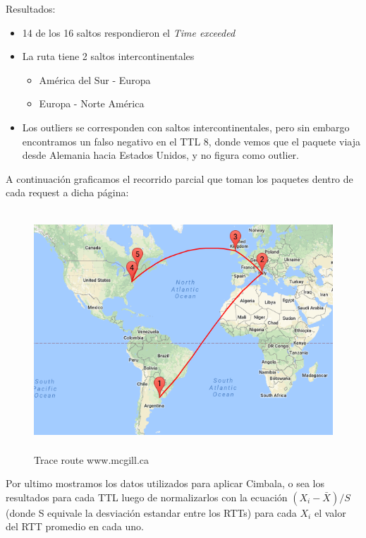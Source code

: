 \documentclass[a4paper,10pt]{article}
\begin{document}
\medskip
\medskip
\medskip

\medskip
\par{Resultados:}
\begin{itemize}
    \item  14 de los 16 saltos respondieron el \textit{Time exceeded}
    \item La ruta tiene 2 saltos intercontinentales
    \begin{itemize}
        \item América del Sur - Europa
        \item Europa - Norte América
    \end{itemize}
    \item Los outliers se corresponden con saltos intercontinentales, pero sin embargo encontramos un falso negativo en el TTL 8, donde vemos que el paquete viaja desde Alemania hacia Estados Unidos, y no figura como outlier.
\end{itemize}

\medskip

\par{A continuación graficamos el recorrido parcial que toman los paquetes dentro de cada request a dicha página: }
\medskip
\begin{figure}[H]
    \centering
    \includegraphics[height=9cm]{imagenes/univesridadCanada.png}
    \caption{Trace route www.mcgill.ca}
\end{figure}


\medskip
\medskip
\par{Por ultimo mostramos los datos utilizados para aplicar Cimbala, o sea los resultados para cada TTL luego de normalizarlos con la ecuación $(X_{i} - \bar{X}) /S $ (donde S equivale la desviación estandar entre los RTTs) para cada $X_{i}$ el valor del RTT promedio en cada uno.}
\end{document}

